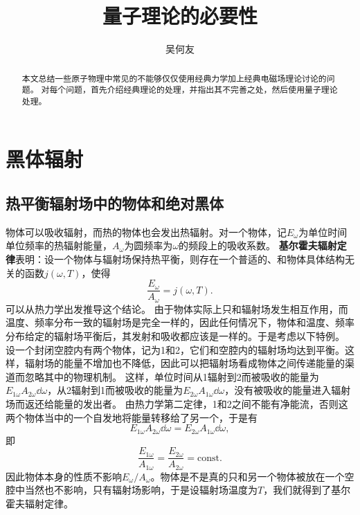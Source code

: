 \documentclass[UTF8, a4paper]{ctexart}
\title{量子理论的必要性}
\author{吴何友}
\newcommand*{\const}{\mathrm{const}}
\begin{document}
\maketitle


\begin{abstract}
    本文总结一些原子物理中常见的不能够仅仅使用经典力学加上经典电磁场理论讨论的问题。
    对每个问题，首先介绍经典理论的处理，并指出其不完善之处，然后使用量子理论处理。
\end{abstract}

\section{黑体辐射}

\subsection{热平衡辐射场中的物体和绝对黑体}

物体可以吸收辐射，而热的物体也会发出热辐射。对一个物体，记$E_\omega$为单位时间单位频率的热辐射能量，$A_\omega$为圆频率为$\omega$的频段上的吸收系数。
\textbf{基尔霍夫辐射定律}表明：设一个物体与辐射场保持热平衡，则存在一个普适的、和物体具体结构无关的函数$j(\omega, T)$，使得
\begin{equation}
    \frac{E_\omega}{A_\omega} = j(\omega, T).
\end{equation}
可以从热力学出发推导这个结论。
由于物体实际上只和辐射场发生相互作用，而温度、频率分布一致的辐射场是完全一样的，因此任何情况下，物体和温度、频率分布给定的辐射场平衡后，其发射和吸收都应该是一样的。于是考虑以下特例。
设一个封闭空腔内有两个物体，记为1和2，它们和空腔内的辐射场均达到平衡。这样，辐射场的能量不增加也不降低，因此可以把辐射场看成物体之间传递能量的渠道而忽略其中的物理机制。
这样，单位时间从1辐射到2而被吸收的能量为$E_{1\omega} A_{2\omega} \dd{\omega}$，从2辐射到1而被吸收的能量为$E_{2\omega} A_{1\omega} \dd{\omega}$，没有被吸收的能量进入辐射场而返还给能量的发出者。
由热力学第二定律，1和2之间不能有净能流，否则这两个物体当中的一个自发地将能量转移给了另一个，于是有
\[
    E_{1\omega} A_{2\omega} \dd{\omega} = E_{2\omega} A_{1\omega} \dd{\omega},
\]
即
\[
    \frac{E_{1\omega}}{A_{1\omega}} = \frac{E_{2\omega}}{A_{2\omega}} = \const.
\]
因此物体本身的性质不影响$E_\omega / A_\omega$。物体是不是真的只和另一个物体被放在一个空腔中当然也不影响，只有辐射场影响，于是设辐射场温度为$T$，我们就得到了基尔霍夫辐射定律。
\end{document}
